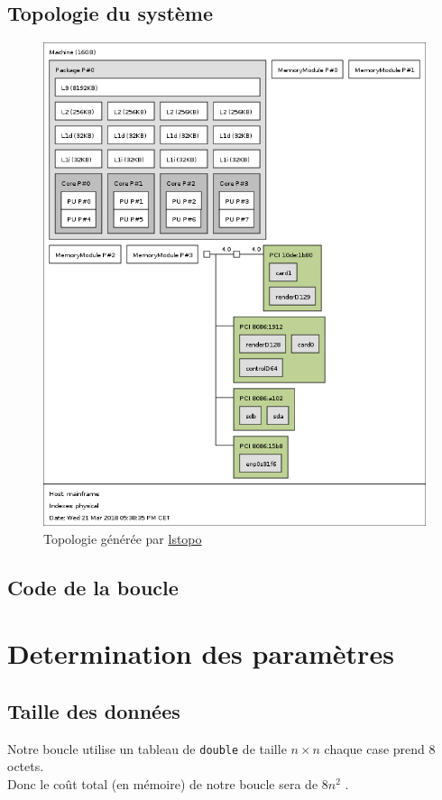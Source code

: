 \documentclass{report}
\begin{document}
  \subsection{Topologie du système}
    \begin{figure}[ht!]
      \centering
      \includegraphics[scale=0.35]{resources/lstopo.png}
      \caption{Topologie générée par \href{https://manpages.debian.org/jessie/hwloc/lstopo.1.en.html}{lstopo}}
    \end{figure}
  \newpage
  \subsection{Code de la boucle}
    
\section{Determination des paramètres}
  \subsection{Taille des données}
    Notre boucle utilise un tableau de \texttt{double} de taille $n\times n$
    chaque case prend 8 octets. \\
    Donc le coût total (en mémoire) de notre boucle sera de $8n^2$ . \\
\end{document}
